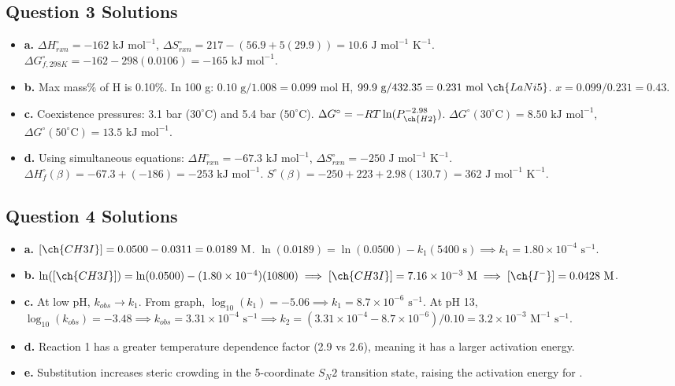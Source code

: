 \documentclass[11pt,letterpaper]{article}
\begin{document}
\subsection*{Question 3 Solutions}
\begin{itemize}[leftmargin=*]
    \item \textbf{a.} $\Delta H^\circ_{rxn} = -162\text{ kJ mol}^{-1}$, $\Delta S^\circ_{rxn} = 217 - (56.9 + 5(29.9)) = 10.6\text{ J mol}^{-1}\text{ K}^{-1}$. $\Delta G^\circ_{f, 298K} = -162 - 298(0.0106) = -165\text{ kJ mol}^{-1}$.
    \item \textbf{b.} Max mass\% of H is 0.10\%. In 100 g: $0.10\text{ g} / 1.008 = 0.099\text{ mol H}$, $99.9\text{ g} / 432.35 = 0.231\text{ mol }\ch{LaNi5}$. $x = 0.099/0.231 = 0.43$.
    \item \textbf{c.} Coexistence pressures: 3.1 bar ($30^\circ\text{C}$) and 5.4 bar ($50^\circ\text{C}$). $\Delta G^\circ = -RT\ln(P_{\ch{H2}}^{-2.98})$. $\Delta G^\circ(30^\circ\text{C}) = 8.50\text{ kJ mol}^{-1}$, $\Delta G^\circ(50^\circ\text{C}) = 13.5\text{ kJ mol}^{-1}$.
    \item \textbf{d.} Using simultaneous equations: $\Delta H^\circ_{rxn} = -67.3\text{ kJ mol}^{-1}$, $\Delta S^\circ_{rxn} = -250\text{ J mol}^{-1}\text{ K}^{-1}$. $\Delta H^\circ_f(\beta) = -67.3 + (-186) = -253\text{ kJ mol}^{-1}$. $S^\circ(\beta) = -250 + 223 + 2.98(130.7) = 362\text{ J mol}^{-1}\text{ K}^{-1}$.
\end{itemize}

\subsection*{Question 4 Solutions}
\begin{itemize}[leftmargin=*]
    \item \textbf{a.} $[\ch{CH3I}] = 0.0500 - 0.0311 = 0.0189\text{ M}$. $\ln(0.0189) = \ln(0.0500) - k_1(5400\text{ s}) \implies k_1 = 1.80\times 10^{-4}\text{ s}^{-1}$.
    \item \textbf{b.} $\ln([\ch{CH3I}]) = \ln(0.0500) - (1.80\times 10^{-4})(10800) \implies [\ch{CH3I}] = 7.16\times 10^{-3}\text{ M} \implies [\ch{I^-}] = 0.0428\text{ M}$.
    \item \textbf{c.} At low pH, $k_{obs} \rightarrow k_1$. From graph, $\log_{10}(k_1) = -5.06 \implies k_1 = 8.7\times 10^{-6}\text{ s}^{-1}$. At pH 13, $\log_{10}(k_{obs}) = -3.48 \implies k_{obs} = 3.31\times 10^{-4}\text{ s}^{-1} \implies k_2 = (3.31\times 10^{-4} - 8.7\times 10^{-6})/0.10 = 3.2\times 10^{-3}\text{ M}^{-1}\text{ s}^{-1}$.
    \item \textbf{d.} Reaction 1 has a greater temperature dependence factor (2.9 vs 2.6), meaning it has a larger activation energy.
    \item \textbf{e.} Substitution increases steric crowding in the 5-coordinate $S_N2$ transition state, raising the activation energy for .
\end{itemize}
\end{document}

